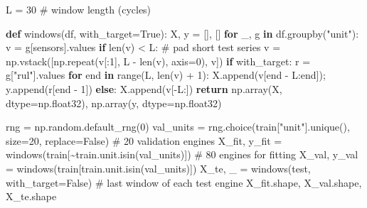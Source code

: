 \documentclass[
  letterpaper,
  DIV=11,
  numbers=noendperiod]{scrreprt}
\newenvironment{Shaded}{\begin{snugshade}}{\end{snugshade}}
\newcommand{\BuiltInTok}[1]{\textcolor[rgb]{0.00,0.23,0.31}{#1}}
\newcommand{\CommentTok}[1]{\textcolor[rgb]{0.37,0.37,0.37}{#1}}
\newcommand{\ControlFlowTok}[1]{\textcolor[rgb]{0.00,0.23,0.31}{\textbf{#1}}}
\newcommand{\DecValTok}[1]{\textcolor[rgb]{0.68,0.00,0.00}{#1}}
\newcommand{\KeywordTok}[1]{\textcolor[rgb]{0.00,0.23,0.31}{\textbf{#1}}}
\newcommand{\NormalTok}[1]{\textcolor[rgb]{0.00,0.23,0.31}{#1}}
\newcommand{\OperatorTok}[1]{\textcolor[rgb]{0.37,0.37,0.37}{#1}}
\newcommand{\StringTok}[1]{\textcolor[rgb]{0.13,0.47,0.30}{#1}}
\newcommand{\VariableTok}[1]{\textcolor[rgb]{0.07,0.07,0.07}{#1}}
\begin{document}
\begin{Shaded}
\begin{Highlighting}[]
\NormalTok{L }\OperatorTok{=} \DecValTok{30}   \CommentTok{\# window length (cycles)}

\KeywordTok{def}\NormalTok{ windows(df, with\_target}\OperatorTok{=}\VariableTok{True}\NormalTok{):}
\NormalTok{    X, y }\OperatorTok{=}\NormalTok{ [], []}
    \ControlFlowTok{for}\NormalTok{ \_, g }\KeywordTok{in}\NormalTok{ df.groupby(}\StringTok{"unit"}\NormalTok{):}
\NormalTok{        v }\OperatorTok{=}\NormalTok{ g[sensors].values}
        \ControlFlowTok{if} \BuiltInTok{len}\NormalTok{(v) }\OperatorTok{\textless{}}\NormalTok{ L:                                   }\CommentTok{\# pad short test series}
\NormalTok{            v }\OperatorTok{=}\NormalTok{ np.vstack([np.repeat(v[:}\DecValTok{1}\NormalTok{], L }\OperatorTok{{-}} \BuiltInTok{len}\NormalTok{(v), axis}\OperatorTok{=}\DecValTok{0}\NormalTok{), v])}
        \ControlFlowTok{if}\NormalTok{ with\_target:}
\NormalTok{            r }\OperatorTok{=}\NormalTok{ g[}\StringTok{"rul"}\NormalTok{].values}
            \ControlFlowTok{for}\NormalTok{ end }\KeywordTok{in} \BuiltInTok{range}\NormalTok{(L, }\BuiltInTok{len}\NormalTok{(v) }\OperatorTok{+} \DecValTok{1}\NormalTok{):}
\NormalTok{                X.append(v[end }\OperatorTok{{-}}\NormalTok{ L:end])}\OperatorTok{;}\NormalTok{ y.append(r[end }\OperatorTok{{-}} \DecValTok{1}\NormalTok{])}
        \ControlFlowTok{else}\NormalTok{:}
\NormalTok{            X.append(v[}\OperatorTok{{-}}\NormalTok{L:])}
    \ControlFlowTok{return}\NormalTok{ np.array(X, dtype}\OperatorTok{=}\NormalTok{np.float32), np.array(y, dtype}\OperatorTok{=}\NormalTok{np.float32)}

\NormalTok{rng }\OperatorTok{=}\NormalTok{ np.random.default\_rng(}\DecValTok{0}\NormalTok{)}
\NormalTok{val\_units }\OperatorTok{=}\NormalTok{ rng.choice(train[}\StringTok{"unit"}\NormalTok{].unique(), size}\OperatorTok{=}\DecValTok{20}\NormalTok{, replace}\OperatorTok{=}\VariableTok{False}\NormalTok{)   }\CommentTok{\# 20 validation engines}
\NormalTok{X\_fit, y\_fit }\OperatorTok{=}\NormalTok{ windows(train[}\OperatorTok{\textasciitilde{}}\NormalTok{train.unit.isin(val\_units)])               }\CommentTok{\# 80 engines for fitting}
\NormalTok{X\_val, y\_val }\OperatorTok{=}\NormalTok{ windows(train[train.unit.isin(val\_units)])}
\NormalTok{X\_te, \_ }\OperatorTok{=}\NormalTok{ windows(test, with\_target}\OperatorTok{=}\VariableTok{False}\NormalTok{)                                }\CommentTok{\# last window of each test engine}
\NormalTok{X\_fit.shape, X\_val.shape, X\_te.shape}
\end{Highlighting}
\end{Shaded}
\end{document}
